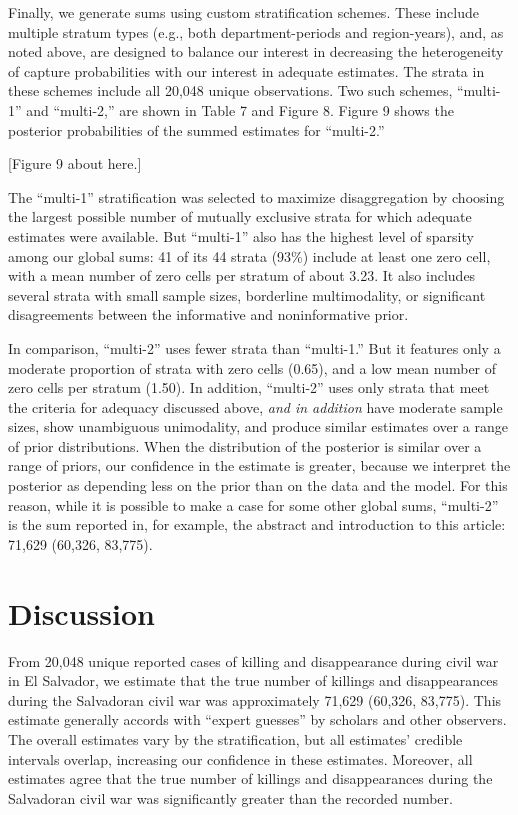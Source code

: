 \documentclass[11pt,]{article}
\begin{document}
Finally, we generate sums using custom stratification schemes. These
include multiple stratum types (e.g., both department-periods and
region-years), and, as noted above, are designed to balance our interest
in decreasing the heterogeneity of capture probabilities with our
interest in adequate estimates. The strata in these schemes include all
20,048 unique observations. Two such schemes, ``multi-1'' and
``multi-2,'' are shown in Table 7 and Figure 8. Figure 9 shows the
posterior probabilities of the summed estimates for ``multi-2.''

{[}Figure 9 about here.{]}

The ``multi-1'' stratification was selected to maximize disaggregation
by choosing the largest possible number of mutually exclusive strata for
which adequate estimates were available. But ``multi-1'' also has the
highest level of sparsity among our global sums: 41 of its 44 strata
(93\%) include at least one zero cell, with a mean number of zero cells
per stratum of about 3.23. It also includes several strata with small
sample sizes, borderline multimodality, or significant disagreements
between the informative and noninformative prior.

In comparison, ``multi-2'' uses fewer strata than ``multi-1.'' But it
features only a moderate proportion of strata with zero cells (0.65),
and a low mean number of zero cells per stratum (1.50). In addition,
``multi-2'' uses only strata that meet the criteria for adequacy
discussed above, \emph{and in addition} have moderate sample sizes, show
unambiguous unimodality, and produce similar estimates over a range of
prior distributions. When the distribution of the posterior is similar
over a range of priors, our confidence in the estimate is greater,
because we interpret the posterior as depending less on the prior than
on the data and the model. For this reason, while it is possible to make
a case for some other global sums, ``multi-2'' is the sum reported in,
for example, the abstract and introduction to this article: 71,629
(60,326, 83,775).

\hypertarget{discussion}{%
\section{Discussion}\label{discussion}}

From 20,048 unique reported cases of killing and disappearance during
civil war in El Salvador, we estimate that the true number of killings
and disappearances during the Salvadoran civil war was approximately
71,629 (60,326, 83,775). This estimate generally accords with ``expert
guesses'' by scholars and other observers. The overall estimates vary by
the stratification, but all estimates' credible intervals overlap,
increasing our confidence in these estimates. Moreover, all estimates
agree that the true number of killings and disappearances during the
Salvadoran civil war was significantly greater than the recorded number.
\end{document}
